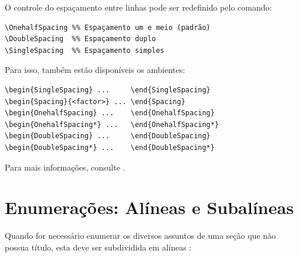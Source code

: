 O controle do espaçamento entre linhas pode ser redefinido pelo comando:

\begin{SingleSpacing}%
\begin{verbatim}
\OnehalfSpacing %% Espaçamento um e meio (padrão)
\DoubleSpacing  %% Espaçamento duplo
\SingleSpacing  %% Espaçamento simples
\end{verbatim}
\end{SingleSpacing}

Para isso, também estão disponíveis os ambientes:

\begin{SingleSpacing}%
\begin{verbatim}
\begin{SingleSpacing} ...     \end{SingleSpacing}
\begin{Spacing}{<factor>} ... \end{Spacing}
\begin{OnehalfSpacing} ...    \end{OnehalfSpacing}
\begin{OnehalfSpacing*} ...   \end{OnehalfSpacing*}
\begin{DoubleSpacing} ...     \end{DoubleSpacing}
\begin{DoubleSpacing*} ...    \end{DoubleSpacing*}
\end{verbatim}
\end{SingleSpacing}

Para mais informações, consulte .

\section{Enumerações: Alíneas e Subalíneas}\label{sec:enumeracoes}

Quando for necessário enumerar os diversos assuntos de uma seção que não possua título, esta deve ser subdividida em alíneas \cite[subseção 4.2]{NBR6024:2012}:

